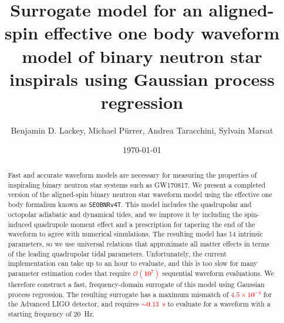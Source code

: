 \documentclass[prd,aps,letter,twocolumn,floatfix,notitlepage,nofootinbib]{revtex4-1}
\newcommand{\red}[1]{\textcolor{red}{#1}}
\begin{document}
\title{Surrogate model for an aligned-spin effective one body waveform model of binary neutron star inspirals using Gaussian process regression}

\author{
Benjamin D. Lackey, 
Michael P\"{u}rrer, 
Andrea Taracchini,
Sylvain Marsat
}

\date{\today}

\begin{abstract}

Fast and accurate waveform models are necessary for measuring the properties of inspiraling binary neutron star systems such as GW170817. We present a completed version of the aligned-spin binary neutron star waveform model using the effective one body formalism known as \texttt{SEOBNRv4T}. This model includes the quadrupolar and octopolar adiabatic and dynamical tides, and we improve it by including the spin-induced quadrupole moment effect and a prescription for tapering the end of the waveform to agree with numerical simulations. The resulting model has 14 intrinsic parameters, so we use universal relations that approximate all matter effects in terms of the leading quadrupolar tidal parameters. 
Unfortunately, the current implementation can take up to an hour to evaluate, and this is too slow for many parameter estimation codes that require \red{$\mathcal{O}(10^7)$} sequential waveform evaluations. We therefore construct a fast, frequency-domain surrogate of this model using Gaussian process regression. The resulting surrogate has a maximum mismatch of \red{$4.5\times 10^{-4}$} for the Advanced LIGO detector, and requires \red{$\sim 0.13$~s} to evaluate for a waveform with a starting frequency of 20~Hz. 

\end{abstract}

\end{document}
